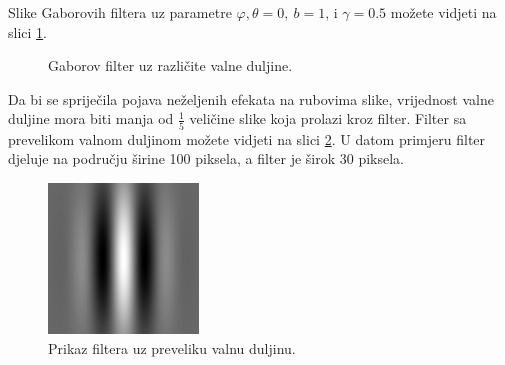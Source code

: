 \documentclass{article}
\begin{document}
Slike Gaborovih filtera uz parametre $\varphi, \theta = 0,\: b = 1$, i $\gamma =
0.5$ možete vidjeti na slici \ref{fig:filter-wavelengths}.

\begin{figure}[htb]
  \centering
  \hspace{50pt}
  \caption{Gaborov filter uz različite valne duljine.}
  \label{fig:filter-wavelengths}
\end{figure}

Da bi se spriječila pojava neželjenih efekata na rubovima slike, vrijednost valne
duljine mora biti manja od $\frac{1}{5}$ veličine slike koja prolazi kroz
filter. Filter sa prevelikom valnom duljinom možete vidjeti na slici
\ref{fig:wavelength-overflow}. U datom primjeru filter djeluje na području
širine 100 piksela, a filter je širok 30 piksela.

\begin{figure}[htb]
\begin{center}
\includegraphics[width=4cm]{images/wavelength30overflow.jpg}
\end{center}
\caption{Prikaz filtera uz preveliku valnu duljinu.}
\label{fig:wavelength-overflow}
\end{figure}
\end{document}
